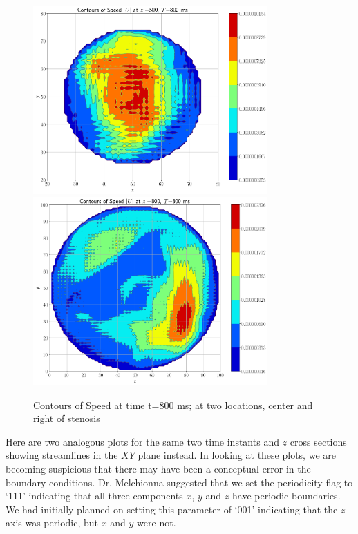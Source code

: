 \documentclass[11pt]{article} %
\begin{document}
\begin{figure}
\centering
\hspace*{-0.25in}
\includegraphics[width=0.8\textwidth]{contour_speed/contour_speed_z_500_t_800.png}
\includegraphics[width=0.8\textwidth]{contour_speed/contour_speed_z_800_t_800.png}
\caption{Contours of Speed at time t=800 ms; at two locations, center and right of stenosis}
\end{figure}

Here are two analogous plots for the same two time instants and $z$ cross sections showing
streamlines in the $XY$ plane instead.
In looking at these plots, we are becoming suspicious that there may have been a 
conceptual error in the boundary conditions.  
Dr. Melchionna suggested that we set the periodicity flag to `111' indicating that all three
components $x$, $y$ and $z$ have periodic boundaries.
We had initially planned on setting this parameter of `001' indicating that the $z$ axis
was periodic, but $x$ and $y$ were not.
\end{document}
